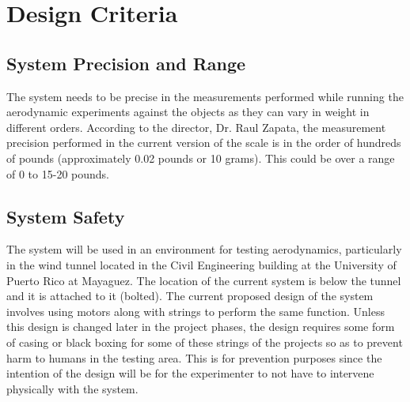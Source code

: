 \section{Design Criteria}
	
	\subsection{System Precision and Range}

    	The system needs to be precise in the measurements performed while running the aerodynamic experiments against the objects as they can vary in weight in different orders. According to the director, Dr. Raul Zapata, the measurement precision performed in the current version of the scale is in the order of hundreds of pounds (approximately 0.02 pounds or 10 grams). This could be over a range of 0 to 15-20 pounds.

	\subsection{System Safety}

   		The system will be used in an environment for testing aerodynamics, particularly in the wind tunnel located in the Civil Engineering building at the University of Puerto Rico at Mayaguez. The location of the current system is below the tunnel and it is attached to it (bolted). The current proposed design of the system involves using motors along with strings to perform the same function. Unless this design is changed later in the project phases, the design requires some form of casing or black boxing for some of these strings of the projects so as to prevent harm to humans in the testing area. This is for prevention purposes since the intention of the design will be for the experimenter to not have to intervene physically with the system.